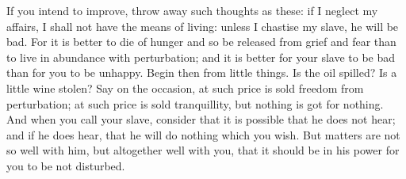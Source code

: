 If you intend  to improve, throw away  such thoughts as these: if  I neglect my
affairs, I shall not  have the means of living: unless I  chastise my slave, he
will be bad.  For it is better to  die of hunger and so be  released from grief
and fear than to live in abundance with perturbation; and it is better for your
slave to be bad  than for you to be unhappy. Begin then  from little things. Is
the oil spilled? Is a little wine stolen? Say on the occasion, at such price is
sold freedom from perturbation; at such price is sold tranquillity, but nothing
is got for nothing. And when you  call your slave, consider that it is possible
that he does not  hear; and if he does hear, that he  will do nothing which you
wish. But matters are not so well  with him, but altogether well with you, that
it should be in his power for you to be not disturbed.
